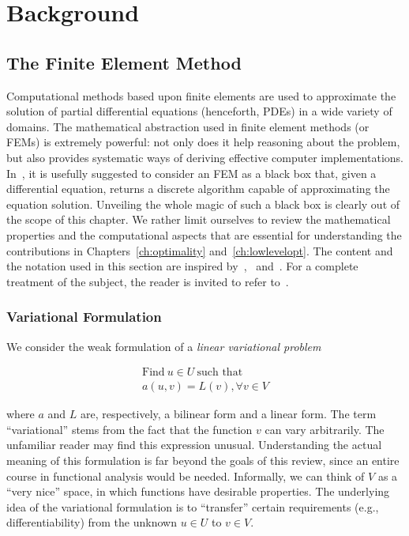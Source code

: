 \chapter{Background}

\section{The Finite Element Method}
\label{sec:bkg:fem}
Computational methods based upon finite elements are used to approximate the solution of partial differential equations (henceforth, PDEs) in a wide variety of domains. The mathematical abstraction used in finite element methods (or FEMs) is extremely powerful: not only does it help reasoning about the problem, but also provides systematic ways of deriving effective computer implementations. In~\cite{brenner-and-scott}, it is usefully suggested to consider an FEM as a black box that, given a differential equation, returns a discrete algorithm capable of approximating the equation solution. Unveiling the whole magic of such a black box is clearly out of the scope of this chapter. We rather limit ourselves to review the mathematical properties and the computational aspects that are essential for understanding the contributions in Chapters~\ref{ch:optimality} and~\ref{ch:lowlevelopt}. The content and the notation used in this section are inspired by~\cite{florian-thesis},~\cite{Fenics} and~\cite{quadrature-olegaard}. For a complete treatment of the subject, the reader is invited to refer to~\cite{brenner-and-scott}.



\subsection{Variational Formulation}
\label{sec:bkg:var-problems}
We consider the weak formulation of a {\em linear variational problem}

\begin{equation}
\begin{split}
\text{Find}\ u \in U\ \text{such that} \\
a(u, v) = L(v), \forall v \in V
\end{split}
\end{equation}

where $a$ and $L$ are, respectively, a bilinear form and a linear form. The term ``variational'' stems from the fact that the function $v$ can vary arbitrarily. The unfamiliar reader may find this expression unusual. Understanding the actual meaning of this formulation is far beyond the goals of this review, since an entire course in functional analysis would be needed. Informally, we can think of $V$ as a ``very nice'' space, in which functions have desirable properties. The underlying idea of the variational formulation is to ``transfer'' certain requirements (e.g., differentiability) from the unknown $u \in U$ to $v \in V$.

